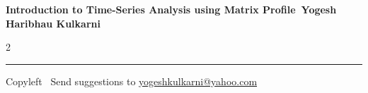 \documentclass[8pt,landscape]{article}
\begin{document}
\footnotesize


\begin{center}
\Large{\textbf{Introduction to Time-Series Analysis using Matrix Profile\ Yogesh Haribhau Kulkarni}}  
\end{center}

\begin{multicols}{2}

\end{multicols}

\rule{\linewidth}{0.25pt}
\scriptsize
Copyleft \textcopyleft\  Send suggestions to 
\href{http://www.yogeshkulkarni.com}{yogeshkulkarni@yahoo.com}
\end{document}
